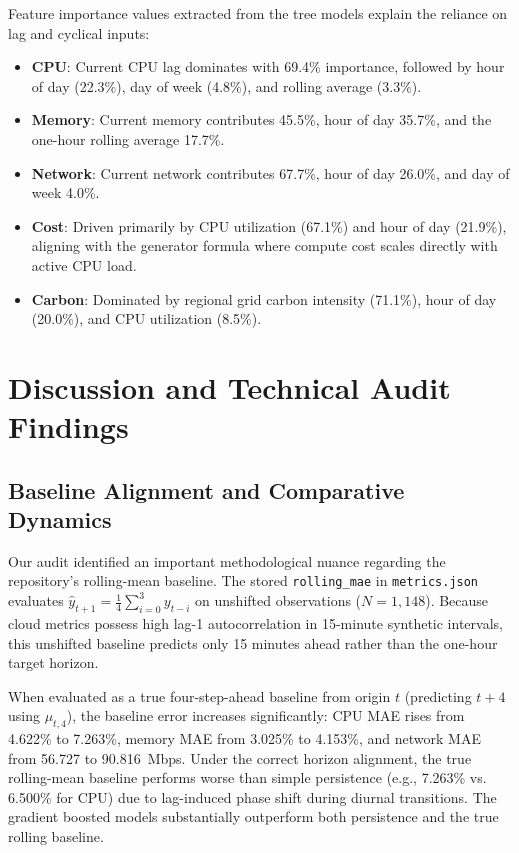 \documentclass[conference]{IEEEtran}
\begin{document}
Feature importance values extracted from the tree models explain the reliance on lag and cyclical inputs:
\begin{itemize}
    \item \textbf{CPU}: Current CPU lag dominates with 69.4\% importance, followed by hour of day (22.3\%), day of week (4.8\%), and rolling average (3.3\%).
    \item \textbf{Memory}: Current memory contributes 45.5\%, hour of day 35.7\%, and the one-hour rolling average 17.7\%.
    \item \textbf{Network}: Current network contributes 67.7\%, hour of day 26.0\%, and day of week 4.0\%.
    \item \textbf{Cost}: Driven primarily by CPU utilization (67.1\%) and hour of day (21.9\%), aligning with the generator formula where compute cost scales directly with active CPU load.
    \item \textbf{Carbon}: Dominated by regional grid carbon intensity (71.1\%), hour of day (20.0\%), and CPU utilization (8.5\%).
\end{itemize}

\section{Discussion and Technical Audit Findings}

\subsection{Baseline Alignment and Comparative Dynamics}
Our audit identified an important methodological nuance regarding the repository's rolling-mean baseline. The stored \texttt{rolling\_mae} in \texttt{metrics.json} evaluates $\hat{y}_{t+1} = \frac{1}{4} \sum_{i=0}^3 y_{t-i}$ on unshifted observations ($N=1{,}148$). Because cloud metrics possess high lag-1 autocorrelation in 15-minute synthetic intervals, this unshifted baseline predicts only 15 minutes ahead rather than the one-hour target horizon.

When evaluated as a true four-step-ahead baseline from origin $t$ (predicting $t+4$ using $\mu_{t,4}$), the baseline error increases significantly: CPU MAE rises from 4.622\% to 7.263\%, memory MAE from 3.025\% to 4.153\%, and network MAE from 56.727 to 90.816~Mbps. Under the correct horizon alignment, the true rolling-mean baseline performs worse than simple persistence (e.g., 7.263\% vs. 6.500\% for CPU) due to lag-induced phase shift during diurnal transitions. The gradient boosted models substantially outperform both persistence and the true rolling baseline.
\end{document}
